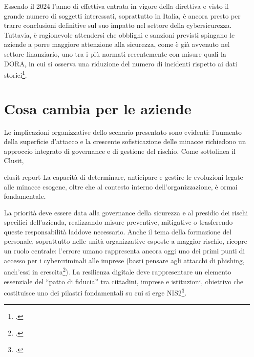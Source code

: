 Essendo il 2024 l'anno di effettiva entrata in vigore della direttiva e visto il grande numero di
soggetti interessati, soprattutto in Italia, è ancora presto per trarre conclusioni definitive
sul suo impatto nel settore della cybersicurezza. Tuttavia, è ragionevole attendersi che obblighi e sanzioni previsti spingano
le aziende a porre maggiore attenzione alla sicurezza, come è già avvenuto nel settore finanziario, 
uno tra i più normati recentemente con misure quali la DORA, in cui si osserva una riduzione del numero di incidenti
rispetto ai dati storici\footcite[pp. 5--6]{clusit-report}.



\section{Cosa cambia per le aziende}
Le implicazioni organizzative dello scenario presentato sono evidenti: l’aumento della superficie d’attacco e la crescente
sofisticazione delle minacce richiedono un approccio integrato di governance e di gestione del rischio. Come
sottolinea il Clusit,
\begin{citazione}[p. 43]{clusit-report}
    La capacità di determinare, anticipare e gestire le evoluzioni legate alle minacce esogene, oltre che al
    contesto interno dell'organizzazione, è ormai fondamentale.
\end{citazione}

La priorità deve essere data alla governance della sicurezza e al presidio dei rischi specifici dell'azienda, 
realizzando misure preventive, mitigative o trasferendo queste responsabilità laddove necessario.
Anche il tema della formazione del personale, soprattutto nelle unità organizzative
esposte a maggior rischio, ricopre un ruolo centrale: l'errore umano rappresenta ancora oggi uno dei 
primi punti di accesso per i cybercriminali alle imprese (basti pensare agli attacchi di phishing,
anch'essi in crescita\footcite[p. 44]{clusit-report}).
La resilienza digitale deve rappresentare un elemento essenziale del “patto di fiducia” tra cittadini, imprese e istituzioni,
obiettivo che costituisce uno dei pilastri fondamentali su cui si erge NIS2\footcite[p. 45]{clusit-report}.



